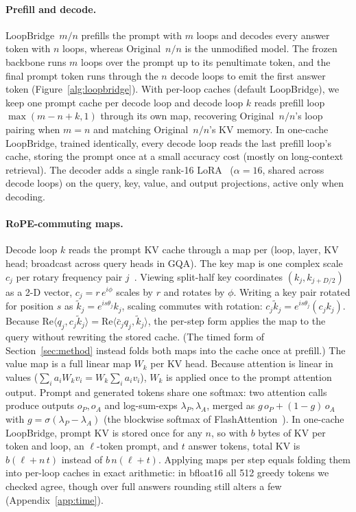 \documentclass[11pt]{article}
\begin{document}
\paragraph{Prefill and decode.} LoopBridge~$m/n$ prefills the prompt with $m$ loops and decodes every answer token with
$n$ loops, whereas Original~$n/n$ is the unmodified model. The frozen backbone runs $m$ loops over the prompt up to its
penultimate token, and the final prompt token runs through the $n$ decode loops to emit the first answer token
(Figure~\ref{alg:loopbridge}). With per-loop caches (default LoopBridge), we keep one prompt cache per decode loop and
decode loop $k$ reads prefill loop $\max(m-n+k,1)$ through its own map, recovering Original~$n/n$'s loop pairing when
$m=n$ and matching Original~$n/n$'s KV memory. In one-cache LoopBridge, trained identically, every decode loop reads the last
prefill loop's cache, storing the prompt once at a small accuracy cost (mostly on long-context retrieval). The decoder
adds a single rank-16 LoRA~\citep{lora} ($\alpha=16$, shared across decode loops) on the query, key, value, and output
projections, active only when decoding.

\paragraph{RoPE-commuting maps.} Decode loop $k$ reads the prompt KV cache through a map per (loop, layer, KV head;
broadcast across query heads in GQA). The key map is one complex scale $c_j$ per rotary frequency pair $j$~\citep{rope}.
Viewing split-half key coordinates $(k_j,k_{j+D/2})$ as a 2-D vector, $c_j=r\,e^{i\phi}$ scales by $r$ and rotates by $\phi$.
Writing a key pair rotated for position $s$ as $\tilde k_j = e^{is\theta_j}k_j$, scaling commutes with rotation:
$c_j\tilde k_j = e^{is\theta_j}(c_jk_j)$. Because $\mathrm{Re}\langle q_j, c_j\tilde k_j\rangle = \mathrm{Re}\langle
\bar c_jq_j, \tilde k_j\rangle$, the per-step form applies the map to the query without rewriting the stored cache. (The
timed form of Section~\ref{sec:method} instead folds both maps into the cache once at prefill.) The value map is a full
linear map $W_k$ per KV head. Because attention is linear in values ($\sum_i a_iW_kv_i = W_k\sum_i a_iv_i$), $W_k$ is
applied once to the prompt attention output. Prompt and generated tokens share one softmax: two attention calls produce
outputs $o_P, o_A$ and log-sum-exps $\lambda_P, \lambda_A$, merged as $g\,o_P+(1-g)\,o_A$ with
$g=\sigma(\lambda_P-\lambda_A)$ (the blockwise softmax of FlashAttention~\citep{flashattn,flashattn2}). In one-cache
LoopBridge, prompt KV is stored once for any $n$, so with $b$ bytes of KV per token and loop, an $\ell$-token prompt,
and $t$ answer tokens, total KV is $b(\ell+n\,t)$ instead of $b\,n(\ell+t)$. Applying maps per step equals folding them
into per-loop caches in exact arithmetic: in bfloat16 all 512 greedy tokens we checked agree, though over full answers
rounding still alters a few (Appendix~\ref{app:time}).
\end{document}
